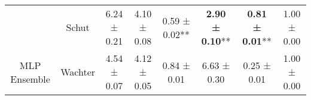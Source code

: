 \begin{table}
{\begin{tabular}[t]{cccccccc}
 & Schut & 6.24 ± 0.21\hphantom{*}\hphantom{*} & 4.10 ± 0.08\hphantom{*}\hphantom{*} & 0.59 ± 0.02** & \textbf{2.90 ± 0.10}** & \textbf{0.81 ± 0.01}** & 1.00 ± 0.00\hphantom{*}\hphantom{*}\\

\multirow[t]{-7}{*}{\centering\arraybackslash MLP Ensemble} & Wachter & 4.54 ± 0.07\hphantom{*}\hphantom{*} & 4.12 ± 0.05\hphantom{*}\hphantom{*} & 0.84 ± 0.01\hphantom{*}\hphantom{*} & 6.63 ± 0.30\hphantom{*}\hphantom{*} & 0.25 ± 0.01\hphantom{*}\hphantom{*} & 1.00 ± 0.00\hphantom{*}\hphantom{*}\\
\bottomrule
\end{tabular}}
\end{table}
